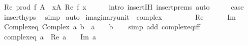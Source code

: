 \begin{isabellebody}
\ {\isachardoublequoteopen}Re\ {\isacharparenleft}{\kern0pt}prod\ f\ A{\isacharparenright}{\kern0pt}\ {\isacharequal}{\kern0pt}\ {\isacharparenleft}{\kern0pt}{\isasymProd}x{\isasymin}A{\isachardot}{\kern0pt}\ Re\ {\isacharparenleft}{\kern0pt}f\ x{\isacharparenright}{\kern0pt}{\isacharparenright}{\kern0pt}{\isachardoublequoteclose}\isanewline
\ \ \ \ \isamarkupfalse%
\ {\isacharparenleft}{\kern0pt}intro\ insert{\isachardot}{\kern0pt}IH\ insert{\isachardot}{\kern0pt}prems{\isacharparenright}{\kern0pt}\ auto\isanewline
\ \ \isamarkupfalse%
\ \isamarkupfalse%
\ {\isacharquery}{\kern0pt}case\ \isamarkupfalse%
\ insert{\isachardot}{\kern0pt}hyps\ \isamarkupfalse%
\ simp\isanewline
{}\isamarkupfalse%
\ auto%
\endisatagproof
{\isafoldproof}%
%
\isadelimproof
%
\endisadelimproof
%
\isadelimdocument
%
\endisadelimdocument
%
\isatagdocument
%
\isamarkuptrue%
%
\endisatagdocument
{\isafolddocument}%
%
\isadelimdocument
%
\endisadelimdocument
{}\isamarkupfalse%
\ imaginary{\isacharunderscore}{\kern0pt}unit\ {\isacharcolon}{\kern0pt}{\isacharcolon}{\kern0pt}\ complex\ \ {\isacharparenleft}{\kern0pt}{\isachardoublequoteopen}{\isasymi}{\isachardoublequoteclose}{\isacharparenright}{\kern0pt}\isanewline
\ \ \isanewline
\ \ \ \ {\isachardoublequoteopen}Re\ {\isasymi}\ {\isacharequal}{\kern0pt}\ {}{\isachardoublequoteclose}\isanewline
\ \ {\isacharbar}{\kern0pt}\ {\isachardoublequoteopen}Im\ {\isasymi}\ {\isacharequal}{\kern0pt}\ {}{\isachardoublequoteclose}\isanewline
\isanewline
{}\isamarkupfalse%
\ Complex{\isacharunderscore}{\kern0pt}eq{\isacharcolon}{\kern0pt}\ {\isachardoublequoteopen}Complex\ a\ b\ {\isacharequal}{\kern0pt}\ a\ {\isacharplus}{\kern0pt}\ {\isasymi}\ {\isacharasterisk}{\kern0pt}\ b{\isachardoublequoteclose}\isanewline
%
\isadelimproof
\ \ %
\endisadelimproof
%
\isatagproof
{}\isamarkupfalse%
\ {\isacharparenleft}{\kern0pt}simp\ add{\isacharcolon}{\kern0pt}\ complex{\isacharunderscore}{\kern0pt}eq{\isacharunderscore}{\kern0pt}iff{\isacharparenright}{\kern0pt}%
\endisatagproof
{\isafoldproof}%
%
\isadelimproof
\isanewline
%
\endisadelimproof
\isanewline
{}\isamarkupfalse%
\ complex{\isacharunderscore}{\kern0pt}eq{\isacharcolon}{\kern0pt}\ {\isachardoublequoteopen}a\ {\isacharequal}{\kern0pt}\ Re\ a\ {\isacharplus}{\kern0pt}\ {\isasymi}\ {\isacharasterisk}{\kern0pt}\ Im\ a{\isachardoublequoteclose}\isanewline

\end{isabellebody}
